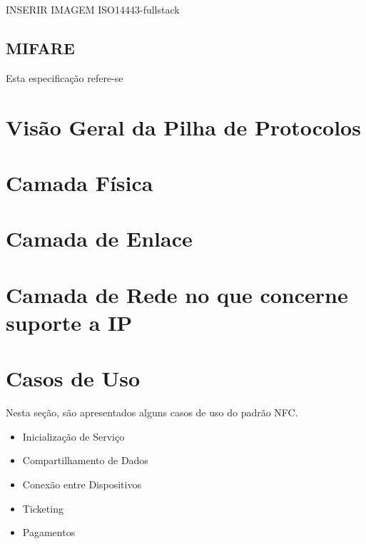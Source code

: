 \documentclass[a4paper,oneside]{article}
\begin{document}
INSERIR IMAGEM {ISO14443-fullstack}

\subsection{MIFARE}
Esta especificação refere-se 

\section{Visão Geral da Pilha de Protocolos}


\section{Camada Física}


\section{Camada de Enlace}
\section{Camada de Rede no que concerne suporte a IP}

\section{Casos de Uso}
Nesta seção, são apresentados alguns casos de uso do padrão NFC.
\begin{itemize}
    \item{Inicialização de Serviço}
    \item{Compartilhamento de Dados}
    \item{Conexão entre Dispositivos}
    \item{Ticketing}
    \item{Pagamentos}
\end{itemize}




\end{document}
